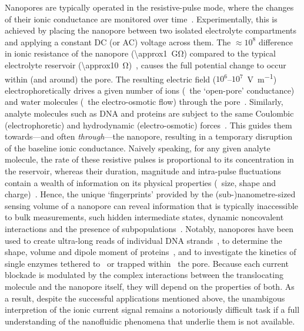 Nanopores are typically operated in the resistive-pulse mode, where the changes of their ionic conductance are
monitored over time~\cite{Bayley-2001,Dekker-2007,Maglia-2010,Venkatesan-2011}. Experimentally, this is
achieved by placing the nanopore between two isolated electrolyte compartments and applying a constant DC (or
AC) voltage across them. The $\approx10^8$ difference in ionic resistance of the nanopore
(\SI{\approx1}{\giga\ohm}) compared to the typical electrolyte reservoir
(\SI{\approx10}{\ohm})~\cite{Maglia-2010}, causes the full potential change to occur within (and around) the
pore. The resulting electric field ($10^6$--$10^7$~\si{\V\per\m}) electrophoretically drives a given number of
ions (\ie~the `open-pore' conductance) and water molecules (\ie~the electro-osmotic flow) through the
pore~\cite{Wong-2007,Mao-2014,Haywood-2014,Laohakunakorn-2015}. Similarly, analyte molecules such as DNA and
proteins are subject to the same Coulombic (electrophoretic) and hydrodynamic (electro-osmotic)
forces~\cite{Wong-2007,Grosberg-2010,Muthukumar-2010,Muthukumar-2014}. This guides them towards---and often
\emph{through}---the nanopore, resulting in a temporary disruption of the baseline ionic conductance. Naively
speaking, for any given analyte molecule, the rate of these resistive pulses is proportional to its
concentration in the reservoir, whereas their duration, magnitude and intra-pulse fluctuations contain a
wealth of information on its physical properties (\eg~size, shape and
charge)~\cite{Howorka-2009,Ying-2019,Lu-2020}. Hence, the unique `fingerprints' provided by the
(sub-)nanometre-sized sensing volume of a nanopore can reveal information that is typically inaccessible to
bulk measurements, such hidden intermediate states, dynamic noncovalent interactions and the presence of
subpopulations~\cite{Ying-2019,Lu-2020}. Notably, nanopores have been used to create ultra-long reads of
individual DNA strands~\cite{Jain-2018}, to determine the shape, volume and dipole moment of
proteins~\cite{Yusko-2017,Houghtaling-2019}, and to investigate the kinetics of single enzymes tethered
to~\cite{Derrington-2015,Harrington-2019} or trapped within~\cite{Li-2020,Galenkamp-2020} the pore. Because
each current blockade is modulated by the complex interactions between the translocating molecule and the
nanopore itself, they will depend on the properties of both. As a result, despite the successful applications
mentioned above, the unambigous interpretion of the ionic current signal remains a notoriously difficult task
if a full understanding of the nanofluidic phenomena that underlie them is not available.

